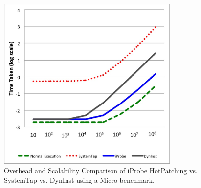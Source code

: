 \begin{figure}[!ht]
  \begin{center}
    \includegraphics[width=0.8\textwidth]{iprobe/Images/scalability.eps}
    \caption{Overhead and Scalability Comparison of iProbe HotPatching vs. SystemTap vs. DynInst using a Micro-benchmark.}
    \label{fig:scalability}
  \end{center}
\end{figure}

%


